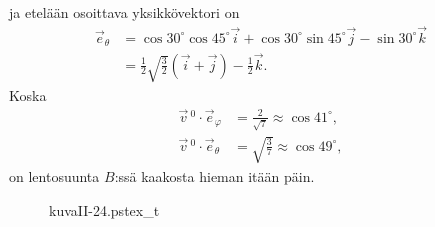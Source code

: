 ja etelään osoittava yksikkövektori on
\begin{align*}
\vec e_\theta &= \cos{30^\circ} \cos{45^\circ} \vec i +
\cos{30^\circ} \sin{45^\circ} \vec j - \sin{30^\circ}\vec k \\
&= \frac{1}{2}\sqrt{\frac{3}{2}}(\vec i + \vec j) - \frac{1}{2} \vec k.
\end{align*}
Koska
\begin{align*}
\vec v\,^0 \cdot \vec e_\varphi &= \frac{2}{\sqrt{7}} \approx \cos{41^\circ}, \\
\vec v\,^0 \cdot \vec e_\theta &= \sqrt{\frac{3}{7}} \approx \cos{49^\circ},
\end{align*}
on lentosuunta $B$:ssä kaakosta hieman itään päin. \loppu
\begin{figure}[H]
\begin{center}
{kuvaII-24.pstex_t}
\end{center}
\end{figure}

